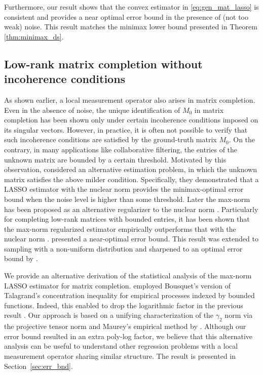 \documentclass[11pt]{article}
\begin{document}
Furthermore, our result shows that the convex estimator in \eqref{eq:gen_mat_lasso} is consistent and provides a near optimal error bound in the presence of (not too weak) noise.
This result matches the minimax lower bound presented in Theorem \ref{thm:minimax_ds}.

\subsection{Low-rank matrix completion without incoherence conditions}

As shown earlier, a local measurement operator also arises in matrix completion. 
Even in the absence of noise, the unique identification of $M_0$ in matrix completion has been shown only under certain incoherence conditions imposed on its singular vectors. 
However, in practice, it is often not possible to verify that such incoherence conditions are satisfied by the ground-truth matrix $M_0$. 
On the contrary, in many applications like collaborative filtering, the entries of the unknown matrix are bounded by a certain threshold. 
Motivated by this observation, \citet{negahban2012restricted} considered an alternative estimation problem, in which the unknown matrix satisfies the above milder condition.
Specifically, they demonstrated that a LASSO estimator with the nuclear norm provides the minimax-optimal error bound when the noise level is higher than some threshold. 
Later the max-norm has been proposed as an alternative regularizer to the nuclear norm \citep{srebro2004maximum,srebro2005rank,linial2007complexity}. 
Particularly for completing low-rank matrices with bounded entries, it has been shown that the max-norm regularized estimator empirically outperforms that with the nuclear norm \citep{srebro2004maximum}.
\citet{foygel2011concentration} presented a near-optimal error bound. 
This result was extended to sampling with a non-uniform distribution and sharpened to an optimal error bound by \citet{cai2016matrix}. 

We provide an alternative derivation of the statistical analysis of the max-norm LASSO estimator for matrix completion. 
\citet{cai2016matrix} employed Bousquet’s version of Talagrand’s concentration inequality for empirical processes indexed by bounded functions. 
Indeed, this enabled to drop the logarithmic factor in the previous result \citep{foygel2011concentration}.
Our approach is based on a unifying characterization of the $\gamma_2$ norm via the projective tensor norm and Maurey's empirical method by \citet{carl1985inequalities}. 
Although our error bound resulted in an extra poly-log factor, we believe that this alternative analysis can be useful to understand other regression problems with a local measurement operator sharing similar structure. 
The result is presented in Section~\ref{sec:err_bnd}.
\end{document}
